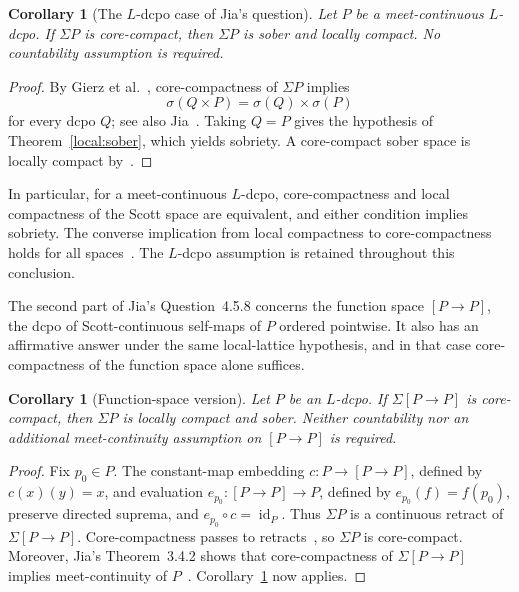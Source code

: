 \documentclass[fleqn,preprint,3p,a4paper]{elsarticle}
\newtheorem{corollary}[theorem]{Corollary}
\theoremstyle{definition}
\begin{document}
\begin{corollary}[The $L$-dcpo case of Jia's question]\label{local:corecompact}
Let $P$ be a meet-continuous $L$-dcpo. If $\Sigma P$ is core-compact, then $\Sigma P$ is sober and locally compact. No countability assumption is required.
\end{corollary}
\begin{proof}
By Gierz et al.~\cite[Theorem~II-4.13]{GHK}, core-compactness of $\Sigma P$ implies
\[
 \sigma(Q\times P)=\sigma(Q)\times\sigma(P)
\]
for every dcpo $Q$; see also Jia~\cite[Theorem~2.5.7]{Jia}. Taking $Q=P$ gives the hypothesis of Theorem~\ref{local:sober}, which yields sobriety. A core-compact sober space is locally compact by~\cite[Theorem~V-5.6]{GHK}.
\end{proof}

In particular, for a meet-continuous $L$-dcpo, core-compactness and local compactness of the Scott space are equivalent, and either condition implies sobriety. The converse implication from local compactness to core-compactness holds for all spaces~\cite[Examples~I-1.7(5)]{GHK}. The $L$-dcpo assumption is retained throughout this conclusion.

The second part of Jia's Question~4.5.8 concerns the function space $[P\to P]$, the dcpo of Scott-continuous self-maps of $P$ ordered pointwise. It also has an affirmative answer under the same local-lattice hypothesis, and in that case core-compactness of the function space alone suffices.

\begin{corollary}[Function-space version]\label{local:functionspace}
Let $P$ be an $L$-dcpo. If $\Sigma[P\to P]$ is core-compact, then $\Sigma P$ is locally compact and sober. Neither countability nor an additional meet-continuity assumption on $[P\to P]$ is required.
\end{corollary}
\begin{proof}
Fix $p_0\in P$. The constant-map embedding $c:P\to[P\to P]$, defined by $c(x)(y)=x$, and evaluation $e_{p_0}:[P\to P]\to P$, defined by $e_{p_0}(f)=f(p_0)$, preserve directed suprema, and $e_{p_0}\circ c=\operatorname{id}_P$. Thus $\Sigma P$ is a continuous retract of $\Sigma[P\to P]$. Core-compactness passes to retracts~\cite[Proposition~2.7.9]{Jia}, so $\Sigma P$ is core-compact. Moreover, Jia's Theorem~3.4.2 shows that core-compactness of $\Sigma[P\to P]$ implies meet-continuity of $P$~\cite{Jia}. Corollary~\ref{local:corecompact} now applies.
\end{proof}
\end{document}

